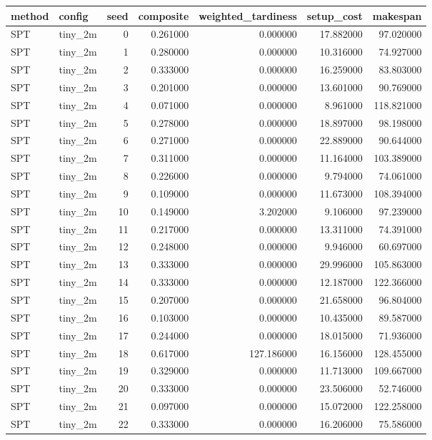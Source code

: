 \begin{tabular}{llrrrrr}
\toprule
method & config & seed & composite & weighted_tardiness & setup_cost & makespan \\
\midrule
SPT & tiny_2m & 0 & 0.261000 & 0.000000 & 17.882000 & 97.020000 \\
SPT & tiny_2m & 1 & 0.280000 & 0.000000 & 10.316000 & 74.927000 \\
SPT & tiny_2m & 2 & 0.333000 & 0.000000 & 16.259000 & 83.803000 \\
SPT & tiny_2m & 3 & 0.201000 & 0.000000 & 13.601000 & 90.769000 \\
SPT & tiny_2m & 4 & 0.071000 & 0.000000 & 8.961000 & 118.821000 \\
SPT & tiny_2m & 5 & 0.278000 & 0.000000 & 18.897000 & 98.198000 \\
SPT & tiny_2m & 6 & 0.271000 & 0.000000 & 22.889000 & 90.644000 \\
SPT & tiny_2m & 7 & 0.311000 & 0.000000 & 11.164000 & 103.389000 \\
SPT & tiny_2m & 8 & 0.226000 & 0.000000 & 9.794000 & 74.061000 \\
SPT & tiny_2m & 9 & 0.109000 & 0.000000 & 11.673000 & 108.394000 \\
SPT & tiny_2m & 10 & 0.149000 & 3.202000 & 9.106000 & 97.239000 \\
SPT & tiny_2m & 11 & 0.217000 & 0.000000 & 13.311000 & 74.391000 \\
SPT & tiny_2m & 12 & 0.248000 & 0.000000 & 9.946000 & 60.697000 \\
SPT & tiny_2m & 13 & 0.333000 & 0.000000 & 29.996000 & 105.863000 \\
SPT & tiny_2m & 14 & 0.333000 & 0.000000 & 12.187000 & 122.366000 \\
SPT & tiny_2m & 15 & 0.207000 & 0.000000 & 21.658000 & 96.804000 \\
SPT & tiny_2m & 16 & 0.103000 & 0.000000 & 10.435000 & 89.587000 \\
SPT & tiny_2m & 17 & 0.244000 & 0.000000 & 18.015000 & 71.936000 \\
SPT & tiny_2m & 18 & 0.617000 & 127.186000 & 16.156000 & 128.455000 \\
SPT & tiny_2m & 19 & 0.329000 & 0.000000 & 11.713000 & 109.667000 \\
SPT & tiny_2m & 20 & 0.333000 & 0.000000 & 23.506000 & 52.746000 \\
SPT & tiny_2m & 21 & 0.097000 & 0.000000 & 15.072000 & 122.258000 \\
SPT & tiny_2m & 22 & 0.333000 & 0.000000 & 16.206000 & 75.586000 \\

\end{tabular}
